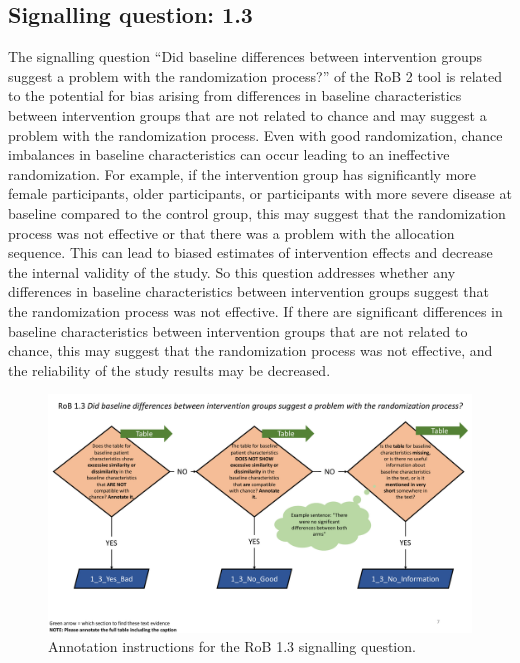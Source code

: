 \documentclass[sn-mathphys,Numbered]{sn-jnl}%
\begin{document}
\subsection*{Signalling question: 1.3}
%
The signalling question ``Did baseline differences between intervention groups suggest a problem with the randomization process?'' of the RoB 2 tool is related to the potential for bias arising from differences in baseline characteristics between intervention groups that are not related to chance and may suggest a problem with the randomization process.
Even with good randomization, chance imbalances in baseline characteristics can occur leading to an ineffective randomization.
For example, if the intervention group has significantly more female participants, older participants, or participants with more severe disease at baseline compared to the control group, this may suggest that the randomization process was not effective or that there was a problem with the allocation sequence.
This can lead to biased estimates of intervention effects and decrease the internal validity of the study.
So this question addresses whether any differences in baseline characteristics between intervention groups suggest that the randomization process was not effective.
If there are significant differences in baseline characteristics between intervention groups that are not related to chance, this may suggest that the randomization process was not effective, and the reliability of the study results may be decreased.
%
%
%
\begin{figure}[hbt]
    \centering
    \includegraphics[width=\textwidth]{figures/1_3.pdf}
    \caption{Annotation instructions for the RoB 1.3 signalling question.}
    \label{fig:1_3}
\end{figure}
\end{document}
